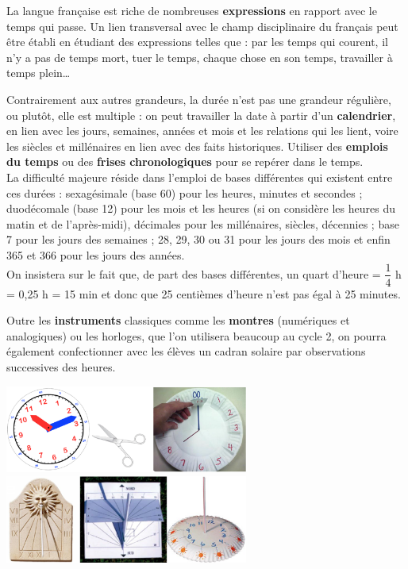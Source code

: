 {La langue française est riche de nombreuses {\bf expressions} en rapport avec le temps qui passe. Un lien transversal avec le champ disciplinaire du français peut être établi en étudiant des expressions telles que : par les temps qui courent, il n’y a pas de temps mort, tuer le temps, chaque chose en son temps, travailler à temps plein\dots \medskip

Contrairement aux autres grandeurs, la durée n'est pas une grandeur régulière, ou plutôt, elle est multiple : on peut travailler la date à partir d'un {\bf calendrier}, en lien avec les jours, semaines, années et mois et les relations qui les lient, voire les siècles et millénaires en lien avec des faits historiques. Utiliser des {\bf emplois du temps} ou des {\bf frises chronologiques} pour se repérer dans le temps. \\
La difficulté majeure réside dans l'emploi de bases différentes qui existent entre ces durées : sexagésimale (base 60) pour les heures, minutes et secondes ; duodécomale (base 12) pour les mois et les heures (si on considère les heures du matin et de l'après-midi), décimales pour les millénaires, siècles, décennies ;  base 7 pour les jours des semaines ; 28, 29, 30 ou 31 pour les jours des mois et enfin 365 et 366 pour les jours des années. \\
On insistera sur le fait que, de part des bases différentes, un quart d'heure = $\dfrac14$ h = 0,25 h = 15 min et donc que 25 centièmes d’heure n'est pas égal à 25 minutes.
\medskip

Outre les {\bf instruments} classiques comme les {\bf montres} (numériques et analogiques) ou les horloges, que l'on utilisera beaucoup au cycle 2, on pourra également confectionner avec les élèves un cadran solaire par observations successives des heures.
\begin{center}
     \includegraphics[width=8cm]{Grandeurs_mesures_did/Images/Grm7_cours_horloges} \quad \includegraphics[width=8cm]{Grandeurs_mesures_did/Images/Grm7_cours_cadran_solaire} \\
\end{center}

}
